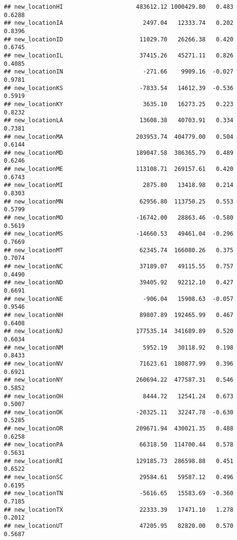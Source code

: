 \documentclass[
]{article}
\begin{document}
\begin{verbatim}
## new_locationHI                     483612.12 1000429.80   0.483   0.6288    
## new_locationIA                       2497.04   12333.74   0.202   0.8396    
## new_locationID                      11029.70   26266.38   0.420   0.6745    
## new_locationIL                      37415.26   45271.11   0.826   0.4085    
## new_locationIN                       -271.66    9909.16  -0.027   0.9781    
## new_locationKS                      -7833.54   14612.39  -0.536   0.5919    
## new_locationKY                       3635.10   16273.25   0.223   0.8232    
## new_locationLA                      13608.38   40703.91   0.334   0.7381    
## new_locationMA                     203953.74  404779.00   0.504   0.6144    
## new_locationMD                     189047.58  386365.79   0.489   0.6246    
## new_locationME                     113108.71  269157.61   0.420   0.6743    
## new_locationMI                       2875.80   13418.98   0.214   0.8303    
## new_locationMN                      62956.80  113750.25   0.553   0.5799    
## new_locationMO                     -16742.00   28863.46  -0.580   0.5619    
## new_locationMS                     -14660.53   49461.04  -0.296   0.7669    
## new_locationMT                      62345.74  166080.26   0.375   0.7074    
## new_locationNC                      37189.07   49115.55   0.757   0.4490    
## new_locationND                      39405.92   92212.10   0.427   0.6691    
## new_locationNE                       -906.04   15908.63  -0.057   0.9546    
## new_locationNH                      89807.89  192465.99   0.467   0.6408    
## new_locationNJ                     177535.14  341689.89   0.520   0.6034    
## new_locationNM                       5952.19   30118.92   0.198   0.8433    
## new_locationNV                      71623.61  180877.99   0.396   0.6921    
## new_locationNY                     260694.22  477587.31   0.546   0.5852    
## new_locationOH                       8444.72   12541.24   0.673   0.5007    
## new_locationOK                     -20325.11   32247.78  -0.630   0.5285    
## new_locationOR                     209671.94  430021.35   0.488   0.6258    
## new_locationPA                      66318.50  114700.44   0.578   0.5631    
## new_locationRI                     129185.73  286598.88   0.451   0.6522    
## new_locationSC                      29584.61   59587.12   0.496   0.6195    
## new_locationTN                      -5616.65   15583.69  -0.360   0.7185    
## new_locationTX                      22333.39   17471.10   1.278   0.2012    
## new_locationUT                      47205.95   82820.00   0.570   0.5687    

\end{verbatim}
\end{document}
